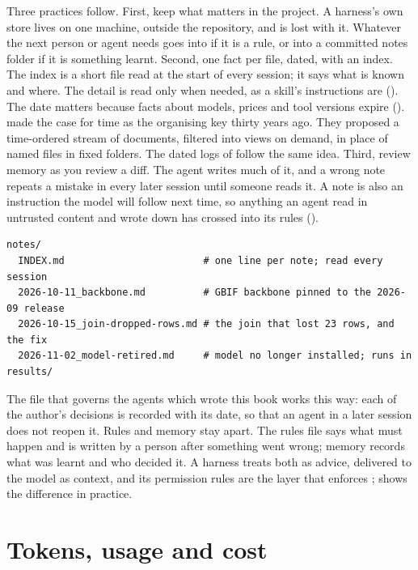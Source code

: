 Three practices follow. First, keep what matters in the project. A
harness's own store lives on one machine, outside the repository, and is
lost with it. Whatever the next person or agent needs goes into
 if it is a rule, or into a committed notes folder if it is
something learnt. Second, one fact per file, dated, with an index. The index
is a short file read at the start of every session; it says what is known
and where. The detail is read only when needed, as a skill's instructions
are (). The date matters because facts about
models, prices and tool versions expire ().
\textcite{freeman1996lifestreams} made the case for time as the organising
key thirty years ago. They proposed a time-ordered stream of documents,
filtered into views on demand, in place of named files in fixed folders. The
dated logs of  follow the same idea. Third, review
memory as you review a diff. The agent writes much of it, and a wrong note
repeats a mistake in every later session until someone reads it. A note is
also an instruction the model will follow next time, so anything an agent
read in untrusted content and wrote down has crossed into its rules
().

\begin{lstlisting}[style=shell,caption={A notes folder an agent can keep}]
notes/
  INDEX.md                        # one line per note; read every session
  2026-10-11_backbone.md          # GBIF backbone pinned to the 2026-09 release
  2026-10-15_join-dropped-rows.md # the join that lost 23 rows, and the fix
  2026-11-02_model-retired.md     # model no longer installed; runs in results/
\end{lstlisting}

The file that governs the agents which wrote this book works this way: each
of the author's decisions is recorded with its date, so that an agent in a
later session does not reopen it. Rules and memory stay apart. The rules
file says what must happen and is written by a person after something went
wrong; memory records what was learnt and who decided it. A harness treats
both as advice, delivered to the model as context, and its permission rules
are the layer that enforces \parencite{liu2026claudecode};
 shows the difference in practice.

\section{Tokens, usage and cost}


